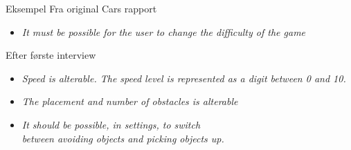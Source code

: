 \begin{frame}{Eksempel}
Fra original Cars rapport
\begin{itemize}
\item \textit{It must be possible for the user to change the difficulty of the game}
\end{itemize}

Efter første interview
\begin{itemize}
\item \textit{Speed is alterable. The speed level is represented as a digit between 0 and 10.}
\item \textit{The placement and number of obstacles is alterable}
\item\textit{ It should be possible, in settings, to switch\\ between avoiding objects and picking objects up.}
\end{itemize}
\end{frame}
